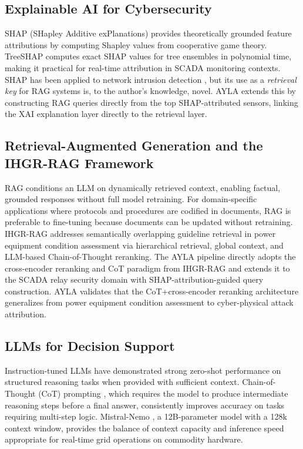 \documentclass[twocolumn, 10pt, letterpaper]{article}
\begin{document}
\subsection{Explainable AI for Cybersecurity}

SHAP (SHapley Additive exPlanations) \cite{lundberg2017shap} provides
theoretically grounded feature attributions by computing Shapley values from
cooperative game theory.
TreeSHAP \cite{lundberg2020treeshap} computes exact SHAP values for
tree ensembles in polynomial time, making it practical for real-time attribution in
SCADA monitoring contexts.
SHAP has been applied to network intrusion detection \cite{shap_ids}, but its
use as a \textit{retrieval key} for RAG systems is, to the author's knowledge, novel.
AYLA extends this by constructing RAG queries directly from the top SHAP-attributed
sensors, linking the XAI explanation layer directly to the retrieval layer.

\subsection{Retrieval-Augmented Generation and the IHGR-RAG Framework}

RAG \cite{lewis2020rag} conditions an LLM on dynamically retrieved context,
enabling factual, grounded responses without full model retraining.
For domain-specific applications where protocols and procedures are codified in
documents, RAG is preferable to fine-tuning because documents can be updated
without retraining.
IHGR-RAG \cite{ihgrrag2025} addresses semantically overlapping guideline retrieval
in power equipment condition assessment via hierarchical retrieval, global context,
and LLM-based Chain-of-Thought reranking.
The AYLA pipeline directly adopts the cross-encoder reranking and CoT paradigm
from IHGR-RAG \cite{ihgrrag2025} and extends it to the SCADA relay security domain
with SHAP-attribution-guided query construction.
AYLA validates that the CoT+cross-encoder reranking architecture generalizes
from power equipment condition assessment to cyber-physical attack attribution.

\subsection{LLMs for Decision Support}

Instruction-tuned LLMs have demonstrated strong zero-shot performance on
structured reasoning tasks when provided with sufficient context.
Chain-of-Thought (CoT) prompting \cite{wei2022cot}, which requires the model to
produce intermediate reasoning steps before a final answer, consistently improves
accuracy on tasks requiring multi-step logic.
Mistral-Nemo \cite{mistral2023}, a 12B-parameter model with a 128k context window,
provides the balance of context capacity and inference speed appropriate for
real-time grid operations on commodity hardware.
\end{document}

